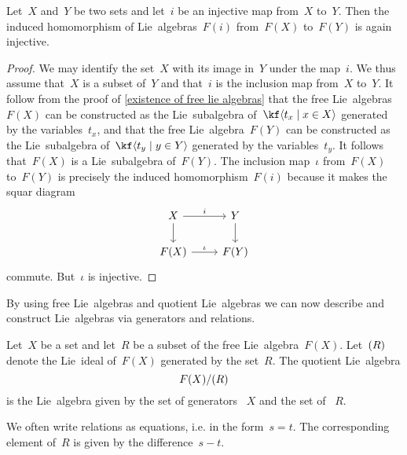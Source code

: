 \begin{corollary}
  \label{subsets give free lie subalgebras}
  Let~$X$ and~$Y$ be two sets and let~$i$ be an injective map from~$X$ to~$Y$.
  Then the induced homomorphism of Lie~algebras~$F(i)$ from~$F(X)$ to~$F(Y)$ is again injective.
\end{corollary}


\begin{proof}
  We may identify the set~$X$ with its image in~$Y$ under the map~$i$.
  We thus assume that~$X$ is a subset of~$Y$ and that~$i$ is the inclusion map from~$X$ to~$Y$.
  It follow from the proof of \cref{existence of free lie algebras} that the free Lie~algebras~$F(X)$ can be constructed as the Lie~subalgebra of~$\kf\gen{ t_x \suchthat x \in X }$ generated by the variables~$t_x$, and that the free Lie~algebra~$F(Y)$ can be constructed as the Lie~subalgebra of~$\kf\gen{ t_y \suchthat y \in Y }$ generated by the variables~$t_y$.
  It follows that~$F(X)$ is a Lie~subalgebra of~$F(Y)$.
  The inclusion map~$\iota$ from~$F(X)$ to~$F(Y)$ is precisely the induced homomorphism~$F(i)$ because it makes the squar diagram
  \[
    \begin{tikzcd}
      X
      \arrow{r}[above]{i}
      \arrow{d}
      &
      Y
      \arrow{d}
      \\
      F(X)
      \arrow{r}[above]{\iota}
      &
      F(Y)
    \end{tikzcd}
  \]
  commute.
  But~$\iota$ is injective.
\end{proof}


\begin{fluff}
  By using free Lie~algebras and quotient Lie~algebras we can now describe and construct Lie~algebras via generators and relations.
\end{fluff}


\begin{definition}
  Let~$X$ be a set and let~$R$ be a subset of the free Lie~algebra~$F(X)$.
  Let~$\lparen R \rparen$ denote the Lie~ideal of~$F(X)$ generated by the set~$R$.
  The quotient Lie~algebra
  \[
    F(X) / \lparen R \rparen
  \]
  is the Lie~algebra given by the set of generators ~$X$ and the set of ~$R$.
\end{definition}


\begin{remark}
  We often write relations as equations, i.e. in the form~$s = t$.
  The corresponding element of~$R$ is given by the difference~$s - t$.
\end{remark}


